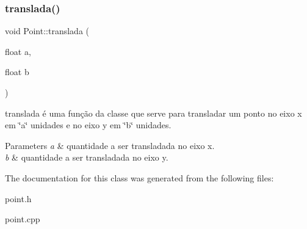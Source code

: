 \subsubsection{\texorpdfstring{translada()}{translada()}}
{\footnotesize\ttfamily void Point\+::translada (\begin{DoxyParamCaption}\item[{float}]{a,  }\item[{float}]{b }\end{DoxyParamCaption})}



translada é uma função da classe que serve para transladar um ponto no eixo x em \char`\"{}a\char`\"{} unidades e no eixo y em \char`\"{}b\char`\"{} unidades. 


\begin{DoxyParams}{Parameters}
{\em a} & quantidade a ser transladada no eixo x. \\
\hline
{\em b} & quantidade a ser transladada no eixo y. \\
\hline
\end{DoxyParams}


The documentation for this class was generated from the following files\+:\begin{DoxyCompactItemize}
\item 
point.\+h\item 
point.\+cpp\end{DoxyCompactItemize}
